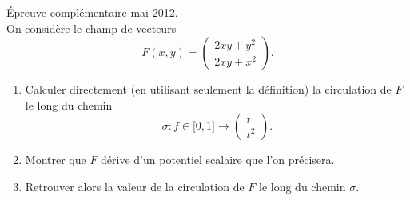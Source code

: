 
\begin{exercice}\label{exoOutilsMath-0143} Épreuve complémentaire mai 2012.\\

On considère le champ de vecteurs
\begin{equation}
    F(x,y)=\begin{pmatrix}
        2xy+y^2    \\ 
        2xy+x^2    
    \end{pmatrix}.
\end{equation}
\begin{enumerate}
    \item
        Calculer directement (en utilisant seulement la définition) la circulation de \( F\) le long du chemin
        \begin{equation}
            \sigma\colon f\in\mathopen[ 0 , 1 \mathclose]\to \begin{pmatrix}
                t    \\ 
                t^2    
            \end{pmatrix}.
        \end{equation}
    \item
        Montrer que \( F\) dérive d'un potentiel scalaire que l'on précisera.
    \item
        Retrouver alors la valeur de la circulation de \( F\) le long du chemin \( \sigma\).
\end{enumerate}

\end{exercice}
